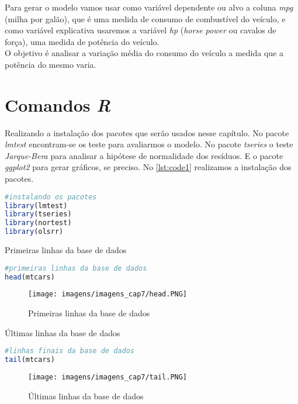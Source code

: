 \noindent Para gerar o modelo vamos usar como variável dependente ou alvo a coluna \textit{mpg} (milha por galão), que é uma medida de consumo de combustível do veículo, e como variável explicativa usaremos a variável \textit{hp} (\textit{horse power} ou cavalos de força), uma medida de potência do veículo.\\

\noindent O objetivo é analisar a variação média do consumo do veículo a medida que a potência do mesmo varia.
\newpage

\section{Comandos \textit{R}}

\noindent Realizando a instalação dos pacotes que serão usados nesse capítulo. No pacote \textit{lmtest} encontram-se os teste para avaliarmos o modelo. No pacote \textit{tseries} o teste \textit{Jarque-Bera} para analisar a hipótese de normalidade dos resíduos. E o pacote \textit{ggplot2} para gerar gráficos, se preciso. No \autoref{lst:code1} realizamos a instalação dos pacotes.


\begin{lstlisting}[language=R, caption = {Instalação dos pacotes}, label={lst:code1}]
#instalando os pacotes
library(lmtest)
library(tseries)
library(nortest)
library(olsrr)
\end{lstlisting}

\noindent Primeiras linhas da base de dados

\begin{lstlisting}[language=R, caption = {Modelo de regressão},label={lst:code2}]
#primeiras linhas da base de dados
head(mtcars)
\end{lstlisting}

\begin{figure}[H]
\centering
\caption{Primeiras linhas da base de dados}
\texttt{[image: imagens/imagens\_cap7/head.PNG]}
\label{fig:modelo2}
\end{figure}

\noindent Últimas linhas da base de dados

\begin{lstlisting}[language=R, caption = {Modelo de regressão},label={lst:code3}]
#linhas finais da base de dados
tail(mtcars)
\end{lstlisting}

\begin{figure}[H]
\centering
\caption{Últimas linhas da base de dados}
\texttt{[image: imagens/imagens\_cap7/tail.PNG]}
\label{fig:modelo3}
\end{figure}


